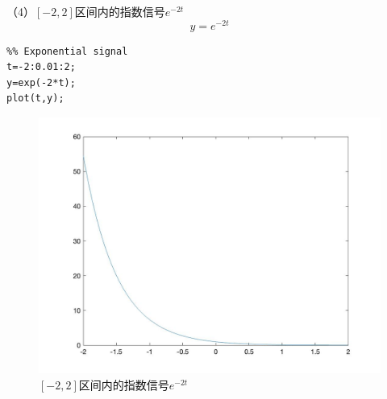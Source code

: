 \documentclass[a4paper,12pt]{ctexart}
\begin{document}
（4）$[-2,2]$区间内的指数信号$e^{-2t}$
\begin{equation}
    y=e^{-2t}
\end{equation}

\begin{lstlisting}
%% Exponential signal
t=-2:0.01:2;
y=exp(-2*t);
plot(t,y);
\end{lstlisting}
\begin{figure}[H]
    \centering
    \includegraphics[width=14cm]{4.jpg}
    \caption{$[-2,2]$区间内的指数信号$e^{-2t}$}
\end{figure}
\end{document}
